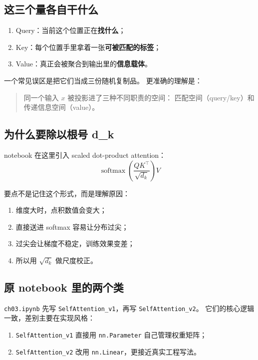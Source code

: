 \documentclass[12pt,a4paper]{ctexart}
\newcommand{\filepath}[1]{\texttt{#1}}
\newcommand{\code}[1]{\texttt{#1}}
\begin{document}
\subsection{这三个量各自干什么}

\begin{enumerate}
  \item Query：当前这个位置正在\textbf{找什么}；
  \item Key：每个位置手里拿着一张\textbf{可被匹配的标签}；
  \item Value：真正会被聚合到输出里的\textbf{信息载体}。
\end{enumerate}

一个常见误区是把它们当成三份随机复制品。
更准确的理解是：

\begin{quote}
同一个输入 \(x\) 被投影进了三种不同职责的空间：
匹配空间（query/key）和传递信息空间（value）。
\end{quote}

\subsection{为什么要除以根号 d\_k}

notebook 在这里引入 scaled dot-product attention：
\[
\operatorname{softmax}\!\left(\frac{QK^\top}{\sqrt{d_k}}\right)V
\]

要点不是记住这个形式，而是理解原因：

\begin{enumerate}
  \item 维度大时，点积数值会变大；
  \item 直接送进 softmax 容易让分布过尖；
  \item 过尖会让梯度不稳定，训练效果变差；
  \item 所以用 \(\sqrt{d_k}\) 做尺度校正。
\end{enumerate}

\subsection{原 notebook 里的两个类}

\filepath{ch03.ipynb} 先写 \code{SelfAttention\_v1}，再写 \code{SelfAttention\_v2}。
它们的核心逻辑一致，差别主要在实现风格：

\begin{enumerate}
  \item \code{SelfAttention\_v1} 直接用 \code{nn.Parameter} 自己管理权重矩阵；
  \item \code{SelfAttention\_v2} 改用 \code{nn.Linear}，更接近真实工程写法。
\end{enumerate}
\end{document}
